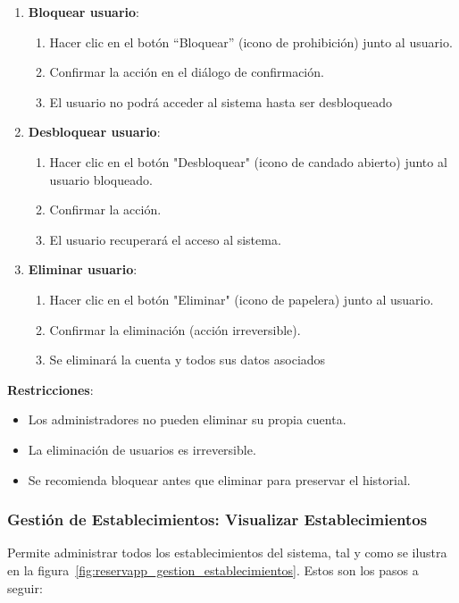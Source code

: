 \begin{enumerate}
   \item \textbf{Bloquear usuario}:
   \begin{enumerate}
      \item Hacer clic en el botón ``Bloquear'' (icono de prohibición) junto al usuario.
	  \item Confirmar la acción en el diálogo de confirmación.
	  \item El usuario no podrá acceder al sistema hasta ser desbloqueado
   \end{enumerate}
   \item \textbf{Desbloquear usuario}:
   \begin{enumerate}
      \item Hacer clic en el botón "Desbloquear" (icono de candado abierto) junto al usuario bloqueado.
      \item Confirmar la acción.
	  \item El usuario recuperará el acceso al sistema.
   \end{enumerate}
   \item \textbf{Eliminar usuario}:
   \begin{enumerate}
      \item Hacer clic en el botón "Eliminar" (icono de papelera) junto al usuario.
	  \item Confirmar la eliminación (acción irreversible).
	  \item Se eliminará la cuenta y todos sus datos asociados
   \end{enumerate}
\end{enumerate}

\textbf{Restricciones}:
\begin{itemize}
   \item Los administradores no pueden eliminar su propia cuenta.
   \item La eliminación de usuarios es irreversible.
   \item Se recomienda bloquear antes que eliminar para preservar el historial.
\end{itemize}

\subsubsection{Gestión de Establecimientos: Visualizar Establecimientos}
Permite administrar todos los establecimientos del sistema, tal y como se ilustra en la figura~\ref{fig:reservapp_gestion_establecimientos}. Estos son los pasos a seguir:

